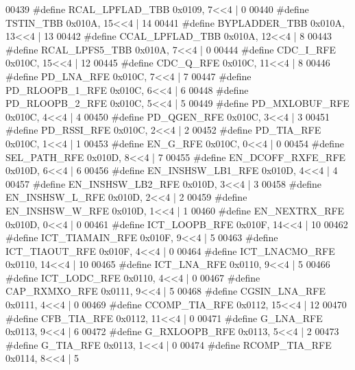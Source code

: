 \begin{DoxyCode}
00439 \textcolor{preprocessor}{#define RCAL\_LPFLAD\_TBB 0x0109, 7<<4 |  0}
00440 \textcolor{preprocessor}{#define TSTIN\_TBB 0x010A, 15<<4 |  14}
00441 \textcolor{preprocessor}{#define BYPLADDER\_TBB 0x010A, 13<<4 |  13}
00442 \textcolor{preprocessor}{#define CCAL\_LPFLAD\_TBB 0x010A, 12<<4 |  8}
00443 \textcolor{preprocessor}{#define RCAL\_LPFS5\_TBB 0x010A, 7<<4 |  0}
00444 \textcolor{preprocessor}{#define CDC\_I\_RFE 0x010C, 15<<4 |  12}
00445 \textcolor{preprocessor}{#define CDC\_Q\_RFE 0x010C, 11<<4 |  8}
00446 \textcolor{preprocessor}{#define PD\_LNA\_RFE 0x010C, 7<<4 |  7}
00447 \textcolor{preprocessor}{#define PD\_RLOOPB\_1\_RFE 0x010C, 6<<4 |  6}
00448 \textcolor{preprocessor}{#define PD\_RLOOPB\_2\_RFE 0x010C, 5<<4 |  5}
00449 \textcolor{preprocessor}{#define PD\_MXLOBUF\_RFE 0x010C, 4<<4 |  4}
00450 \textcolor{preprocessor}{#define PD\_QGEN\_RFE 0x010C, 3<<4 |  3}
00451 \textcolor{preprocessor}{#define PD\_RSSI\_RFE 0x010C, 2<<4 |  2}
00452 \textcolor{preprocessor}{#define PD\_TIA\_RFE 0x010C, 1<<4 |  1}
00453 \textcolor{preprocessor}{#define EN\_G\_RFE 0x010C, 0<<4 |  0}
00454 \textcolor{preprocessor}{#define SEL\_PATH\_RFE 0x010D, 8<<4 |  7}
00455 \textcolor{preprocessor}{#define EN\_DCOFF\_RXFE\_RFE 0x010D, 6<<4 |  6}
00456 \textcolor{preprocessor}{#define EN\_INSHSW\_LB1\_RFE 0x010D, 4<<4 |  4}
00457 \textcolor{preprocessor}{#define EN\_INSHSW\_LB2\_RFE 0x010D, 3<<4 |  3}
00458 \textcolor{preprocessor}{#define EN\_INSHSW\_L\_RFE 0x010D, 2<<4 |  2}
00459 \textcolor{preprocessor}{#define EN\_INSHSW\_W\_RFE 0x010D, 1<<4 |  1}
00460 \textcolor{preprocessor}{#define EN\_NEXTRX\_RFE 0x010D, 0<<4 |  0}
00461 \textcolor{preprocessor}{#define ICT\_LOOPB\_RFE 0x010F, 14<<4 |  10}
00462 \textcolor{preprocessor}{#define ICT\_TIAMAIN\_RFE 0x010F, 9<<4 |  5}
00463 \textcolor{preprocessor}{#define ICT\_TIAOUT\_RFE 0x010F, 4<<4 |  0}
00464 \textcolor{preprocessor}{#define ICT\_LNACMO\_RFE 0x0110, 14<<4 |  10}
00465 \textcolor{preprocessor}{#define ICT\_LNA\_RFE 0x0110, 9<<4 |  5}
00466 \textcolor{preprocessor}{#define ICT\_LODC\_RFE 0x0110, 4<<4 |  0}
00467 \textcolor{preprocessor}{#define CAP\_RXMXO\_RFE 0x0111, 9<<4 |  5}
00468 \textcolor{preprocessor}{#define CGSIN\_LNA\_RFE 0x0111, 4<<4 |  0}
00469 \textcolor{preprocessor}{#define CCOMP\_TIA\_RFE 0x0112, 15<<4 |  12}
00470 \textcolor{preprocessor}{#define CFB\_TIA\_RFE 0x0112, 11<<4 |  0}
00471 \textcolor{preprocessor}{#define G\_LNA\_RFE 0x0113, 9<<4 |  6}
00472 \textcolor{preprocessor}{#define G\_RXLOOPB\_RFE 0x0113, 5<<4 |  2}
00473 \textcolor{preprocessor}{#define G\_TIA\_RFE 0x0113, 1<<4 |  0}
00474 \textcolor{preprocessor}{#define RCOMP\_TIA\_RFE 0x0114, 8<<4 |  5}

\end{DoxyCode}
